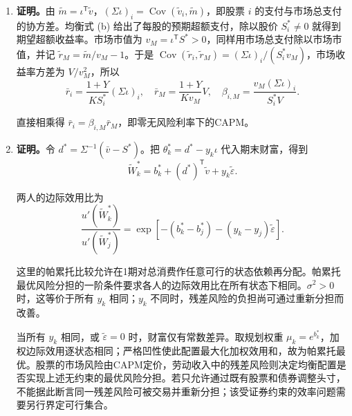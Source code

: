 \begin{solution}[blank-type=manual,blank-vsep=9\baselineskip]
\begin{enumerate}[label=(\alph*)]
\item \textbf{证明。}由 $\widetilde m=\iota^{\mathsf T}\widetilde v$，$(\Sigma\iota)_i=\operatorname{Cov}(\widetilde v_i,\widetilde m)$，即股票 $i$ 的支付与市场总支付的协方差。均衡式 (b) 给出了每股的预期超额支付，除以股价 $S_i^*\ne0$ 就得到期望超额收益率。市场市值为 $v_M=\iota^{\mathsf T}S^*>0$，同样用市场总支付除以市场市值，并记 $\widetilde r_M=\widetilde m/v_M-1$。于是 $\operatorname{Cov}(\widetilde r_i,\widetilde r_M)=(\Sigma\iota)_i/(S_i^*v_M)$，市场收益率方差为 $V/v_M^2$，所以
\[
 \bar r_i=\frac{1+Y}{KS_i^*}(\Sigma\iota)_i,\quad
 \bar r_M=\frac{1+Y}{Kv_M}V,\quad
 \beta_{i,M}=\frac{v_M(\Sigma\iota)_i}{S_i^*V}.
\]

直接相乘得 $\bar r_i=\beta_{i,M}\bar r_M$，即零无风险利率下的CAPM。

\item \textbf{证明。}令 $d^*=\Sigma^{-1}(\bar v-S^*)$。把 $\theta_k^*=d^*-y_k\iota$ 代入期末财富，得到
\[
 \widetilde W_k^*=b_k^*+(d^*)^{\mathsf T}\widetilde v+y_k\widetilde\varepsilon.
\]

两人的边际效用比为
\[
 \frac{u'(\widetilde W_k^*)}{u'(\widetilde W_j^*)}
 =\exp[-(b_k^*-b_j^*)-(y_k-y_j)\widetilde\varepsilon].
\]

这里的帕累托比较允许在1期对总消费作任意可行的状态依赖再分配。帕累托最优风险分担的一阶条件要求各人的边际效用比在所有状态下相同。$\sigma^2>0$ 时，这等价于所有 $y_k$ 相同；$y_k$ 不同时，残差风险的负担尚可通过重新分担而改善。

当所有 $y_k$ 相同，或 $\widetilde\varepsilon=0$ 时，财富仅有常数差异。取规划权重 $\mu_k=e^{b_k^*}$，加权边际效用逐状态相同；严格凹性使此配置最大化加权效用和，故为帕累托最优。股票的市场风险由CAPM定价，劳动收入中的残差风险则决定均衡配置是否实现上述无约束的最优风险分担。若只允许通过既有股票和债券调整头寸，不能据此断言同一残差风险可被交易并重新分担；该受证券约束的效率问题需要另行界定可行集合。\qedhere
\end{enumerate}
\end{solution}

